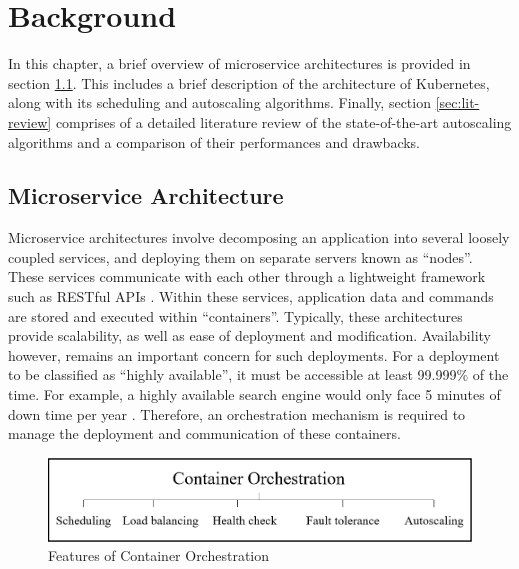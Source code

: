 \clearpage

\def\chaptertitle{Background}

\lhead{\emph{\chaptertitle}}

\chapter{\chaptertitle}
\label{ch:background}

In this chapter, a brief overview of microservice architectures is provided in section \ref{sec:micro-svc-arc}. This includes a brief description of the architecture of Kubernetes, along with its scheduling and autoscaling algorithms. Finally, section \ref{sec:lit-review} comprises of a detailed literature review of the state-of-the-art autoscaling algorithms and a comparison of their performances and drawbacks.

\section{Microservice Architecture}
\label{sec:micro-svc-arc}

Microservice architectures involve decomposing an application into several loosely coupled services, and deploying them on separate servers known as ``nodes''. These services communicate with each other through a lightweight framework such as RESTful APIs \cite{li2021understanding}. Within these services, application data and commands are stored and executed within ``containers''. Typically, these architectures provide scalability, as well as ease of deployment and modification. Availability however, remains an important concern for such deployments. For a deployment to be classified as ``highly available'', it must be accessible at least 99.999\% of the time. For example, a highly available search engine would only face 5 minutes of down time per year \cite{nabi2016availability}. Therefore, an orchestration mechanism is required to manage the deployment and communication of these containers.\par

\begin{figure}[htb]
    \centering
    \includegraphics[width=0.9\linewidth]{Figures/Container-Orchestration.png}
    \caption{Features of Container Orchestration}
    \label{fig:container-orchestration}
\end{figure}

